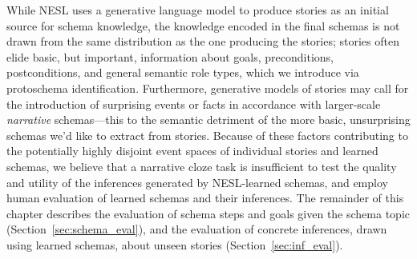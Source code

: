 While NESL uses a generative language model to produce stories as an initial source for schema knowledge, the knowledge encoded in the final schemas is not drawn from the same distribution as the one producing the stories; stories often elide basic, but important, information about goals, preconditions, postconditions, and general semantic role types, which we introduce via protoschema identification. Furthermore, generative models of stories may call for the introduction of surprising events or facts in accordance with larger-scale \textit{narrative} schemas---this to the semantic detriment of the more basic, unsurprising schemas we'd like to extract from stories. Because of these factors contributing to the potentially highly disjoint event spaces of individual stories and learned schemas, we believe that a narrative cloze task is insufficient to test the quality and utility of the inferences generated by NESL-learned schemas, and employ human evaluation of learned schemas and their inferences. The remainder of this chapter describes the evaluation of schema steps and goals given the schema topic (Section~\ref{sec:schema_eval}), and the evaluation of concrete inferences, drawn using learned schemas, about unseen stories (Section~\ref{sec:inf_eval}).
